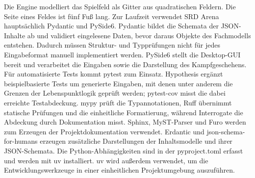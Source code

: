 {}
\markdownRendererSectionEnd \markdownRendererSectionBegin
{}\markdownRendererInterblockSeparator
{}Die Engine modelliert das Spielfeld als Gitter aus quadratischen Feldern. Die Seite eines Feldes ist fünf Fuß lang.\markdownRendererParagraphSeparator
{}\markdownRendererParagraphSeparator
{}
\markdownRendererSectionEnd 
\markdownRendererSectionEnd 
\markdownRendererSectionEnd \markdownRendererSectionBegin
{}\markdownRendererInterblockSeparator
{}Zur Laufzeit verwendet SRD Arena hauptsächlich Pydantic und PySide6. Pydantic bildet die Schemata der JSON-Inhalte ab und validiert eingelesene Daten, bevor daraus Objekte des Fachmodells entstehen. Dadurch müssen Struktur- und Typprüfungen nicht für jedes Eingabeformat manuell implementiert werden. PySide6 stellt die Desktop-GUI bereit und verarbeitet die Eingaben sowie die Darstellung des Kampfgeschehens.\markdownRendererParagraphSeparator
{}Für automatisierte Tests kommt pytest zum Einsatz. Hypothesis ergänzt beispielbasierte Tests um generierte Eingaben, mit denen unter anderem die Grenzen der Lebenspunktlogik geprüft werden; pytest-cov misst die dabei erreichte Testabdeckung. mypy prüft die Typannotationen, Ruff übernimmt statische Prüfungen und die einheitliche Formatierung, während Interrogate die Abdeckung durch Dokumentation misst.\markdownRendererParagraphSeparator
{}Sphinx, MyST-Parser und Furo werden zum Erzeugen der Projektdokumentation verwendet. Erdantic und json-schema-for-humans erzeugen zusätzliche Darstellungen der Inhaltsmodelle und ihrer JSON-Schemata. Die Python-Abhängigkeiten sind in der pyproject.toml erfasst und werden mit uv installiert. uv wird außerdem verwendet, um die Entwicklungswerkzeuge in einer einheitlichen Projektumgebung auszuführen.\markdownRendererParagraphSeparator
{}\markdownRendererInterblockSeparator
